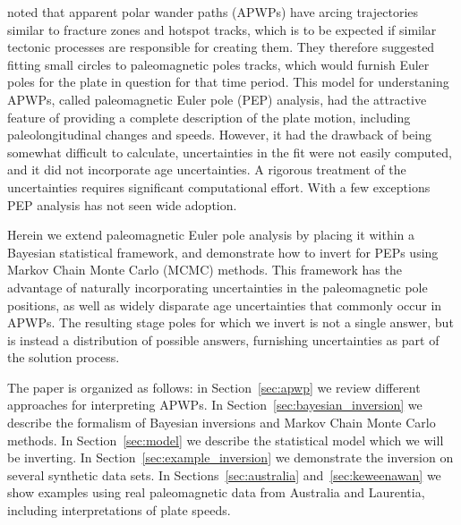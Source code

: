 \documentclass[preprint,12pt,authoryear]{elsarticle}
\begin{document}
\citet{gordon1984paleomagnetic} noted that apparent polar wander paths (APWPs) have 
arcing trajectories similar to fracture zones and hotspot tracks, which is
to be expected if similar tectonic processes are responsible for creating them.
They therefore suggested fitting small circles to paleomagnetic poles tracks,
which would furnish Euler poles for the plate in question for that time period.
This model for understaning APWPs, called paleomagnetic Euler pole (PEP) analysis,
 had the attractive feature of providing a complete description of the plate motion, 
including paleolongitudinal changes and speeds. 
However, it had the drawback of being somewhat difficult to calculate,
uncertainties in the fit were not easily computed, 
and it did not incorporate age uncertainties. 
A rigorous treatment of the uncertainties requires significant computational effort.
With a few exceptions \citep{beck1989paleomagnetism, tarling1996palaeomagnetic, bryan1986rotation, beck2003absolute, smirnov2010co} 
PEP analysis has not seen wide adoption.

Herein we extend paleomagnetic Euler pole analysis by placing it within
a Bayesian statistical framework, and demonstrate how to invert for PEPs
using Markov Chain Monte Carlo (MCMC) methods. This framework has the advantage
of naturally incorporating uncertainties in the paleomagnetic pole positions,
as well as widely disparate age uncertainties that commonly occur in APWPs.
The resulting stage poles for which we invert is not a single answer, but is instead
a distribution of possible answers, furnishing uncertainties as part of the solution process.

The paper is organized as follows: in Section~\ref{sec:apwp} we review different
approaches for interpreting APWPs. In Section~\ref{sec:bayesian_inversion} we
describe the formalism of Bayesian inversions and Markov Chain Monte Carlo methods.
In Section~\ref{sec:model} we describe the statistical model which we will be inverting.
In Section~\ref{sec:example_inversion} we demonstrate the inversion on several
synthetic data sets. In Sections~\ref{sec:australia} and~\ref{sec:keweenawan}
we show examples using real paleomagnetic data from Australia and Laurentia,
including interpretations of plate speeds.
\end{document}
